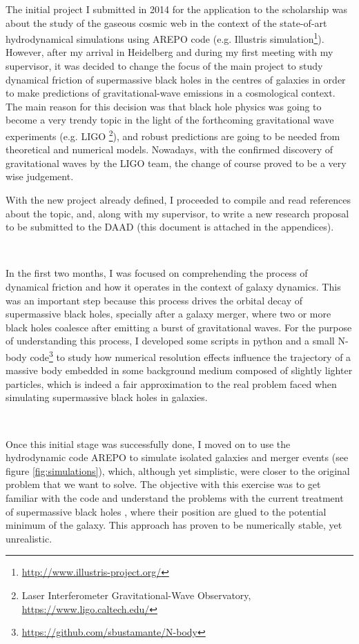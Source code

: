 \documentclass[a4,useAMS,usenatbib,usegraphicx,12pt]{article}
\begin{document}
The initial project I submitted in 2014 for the application to the scholarship 
was about the study of the gaseous cosmic web in the context of the state-of-art 
hydrodynamical simulations using AREPO code \citep{Springel2010} (e.g. Illustris 
simulation\footnote{\url{http://www.illustris-project.org/}}). However, after
my arrival in Heidelberg and during my first meeting with my supervisor, it was 
decided to change the focus of the main project to study dynamical friction of
supermassive black holes in the centres of galaxies in order to make predictions 
of gravitational-wave emissions in a cosmological context. The main reason for 
this decision was that black hole physics was going to become a very trendy topic 
in the light of the forthcoming gravitational wave experiments (e.g. LIGO 
\footnote{Laser Interferometer Gravitational-Wave Observatory, 
\url{https://www.ligo.caltech.edu/}}), and robust predictions are going to be 
needed from theoretical and numerical models. Nowadays, with the confirmed discovery 
of gravitational waves by the LIGO team, the change of course proved to be a very 
wise judgement.

With the new project already defined, I proceeded to compile and read references
about the topic, and, along with my supervisor, to write a new research proposal
to be submitted to the DAAD (this document is attached in the appendices).

\

In the first two months, I was focused on comprehending the process of dynamical 
friction and how it operates in the context of galaxy dynamics. This was an
important step because this process drives the orbital decay of supermassive 
black holes, specially after a galaxy merger, where two or more black holes 
coalesce after emitting a burst of gravitational waves. For the purpose of 
understanding this process, I developed some scripts in python and a small 
N-body code\footnote{\url{https://github.com/sbustamante/N-body}} to study how 
numerical resolution effects influence the trajectory of a massive body embedded 
in some background medium composed of slightly lighter particles, which is 
indeed a fair approximation to the real problem faced when simulating 
supermassive black holes in galaxies.

\

Once this initial stage was successfully done, I moved on to use the 
hydrodynamic code AREPO to simulate isolated galaxies and merger events (see
figure \ref{fig:simulations}), which, although yet simplistic, were closer 
to the original problem that we want to solve. The objective with this 
exercise was to get familiar with the code and understand the problems with 
the current treatment of supermassive black holes \citep{Springel11}, where 
their position are glued to the potential minimum of the galaxy. 
This approach has proven to be numerically stable, yet unrealistic.
\end{document}
